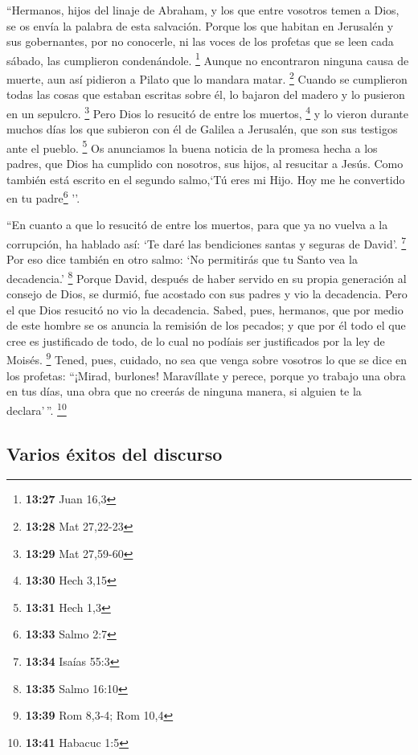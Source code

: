  ``Hermanos, hijos del linaje de Abraham, y los que entre
vosotros temen a Dios, se os envía la palabra de esta salvación.
 Porque los que habitan en Jerusalén y sus gobernantes,
por no conocerle, ni las voces de los profetas que se leen cada sábado,
las cumplieron condenándole. \footnote{\textbf{13:27} Juan 16,3}
 Aunque no encontraron ninguna causa de muerte, aun así
pidieron a Pilato que lo mandara matar. \footnote{\textbf{13:28} Mat
  27,22-23}  Cuando se cumplieron todas las cosas que
estaban escritas sobre él, lo bajaron del madero y lo pusieron en un
sepulcro. \footnote{\textbf{13:29} Mat 27,59-60}  Pero
Dios lo resucitó de entre los muertos, \footnote{\textbf{13:30} Hech
  3,15}  y lo vieron durante muchos días los que subieron
con él de Galilea a Jerusalén, que son sus testigos ante el pueblo.
\footnote{\textbf{13:31} Hech 1,3}  Os anunciamos la
buena noticia de la promesa hecha a los padres,  que Dios
ha cumplido con nosotros, sus hijos, al resucitar a Jesús. Como también
está escrito en el segundo salmo,`Tú eres mi Hijo. Hoy me he convertido
en tu padre\footnote{\textbf{13:33} Salmo 2:7} ''.

 ``En cuanto a que lo resucitó de entre los muertos, para
que ya no vuelva a la corrupción, ha hablado así: `Te daré las
bendiciones santas y seguras de David'. \footnote{\textbf{13:34} Isaías
  55:3}  Por eso dice también en otro salmo: `No
permitirás que tu Santo vea la decadencia.' \footnote{\textbf{13:35}
  Salmo 16:10}  Porque David, después de haber servido en
su propia generación al consejo de Dios, se durmió, fue acostado con sus
padres y vio la decadencia.  Pero el que Dios resucitó no
vio la decadencia.  Sabed, pues, hermanos, que por medio
de este hombre se os anuncia la remisión de los pecados; 
y que por él todo el que cree es justificado de todo, de lo cual no
podíais ser justificados por la ley de Moisés. \footnote{\textbf{13:39}
  Rom 8,3-4; Rom 10,4}  Tened, pues, cuidado, no sea que
venga sobre vosotros lo que se dice en los profetas: 
``¡Mirad, burlones! Maravíllate y perece, porque yo trabajo una obra en
tus días, una obra que no creerás de ninguna manera, si alguien te la
declara'\,''. \footnote{\textbf{13:41} Habacuc 1:5}

\hypertarget{varios-uxe9xitos-del-discurso}{%
\subsection{Varios éxitos del
discurso}\label{varios-uxe9xitos-del-discurso}}

